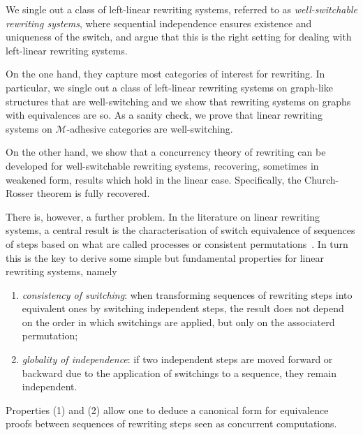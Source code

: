 \documentclass[a4paper,UKenglish,cleveref,pdftex,thm-restate,numberwithinsect,anonymous]{lipics}
\begin{document}
We single out a class of left-linear rewriting
systems, referred to as \emph{well-switchable rewriting systems}, 
where sequential independence ensures existence and uniqueness of the
switch, and argue that this is the right setting for dealing with
left-linear rewriting systems.


On the one hand, they capture most categories of
interest for rewriting. In particular, we single out a class of
left-linear rewriting systems on graph-like structures that are
well-switching and we show that rewriting systems on graphs with
equivalences are so. 
As a sanity check, we prove that linear rewriting systems on
$\mathcal{M}$-adhesive categories are well-switching.

On the other hand, we show that a concurrency theory of rewriting can
be developed for well-switchable rewriting systems, recovering, sometimes in
weakened form, results which hold in the linear case.  Specifically, 
the Church-Rosser theorem is fully recovered.



  


There is, however, a further problem. In the literature on linear
rewriting systems, a central result is the characterisation of
switch equivalence of sequences of steps based on what are called processes or
consistent permutations~\cite{Handbook, BaldanCHKS06, tobias}.
In turn this is the key
to derive some simple but fundamental properties for linear rewriting
systems, namely

\begin{enumerate}
\item \emph{consistency of switching}: when transforming
  sequences of rewriting steps into equivalent ones by switching independent steps, the
  result does not depend on the order in which switchings are applied, but
  only on the associaterd permutation;
\item \emph{globality of independence}: if two independent steps are
  moved forward or backward due to the application of switchings to a
  sequence, they remain independent.
\end{enumerate}
Properties (1) and (2) allow one to deduce a canonical form for equivalence proofs 
between sequences of rewriting steps seen as concurrent computations.
\end{document}
